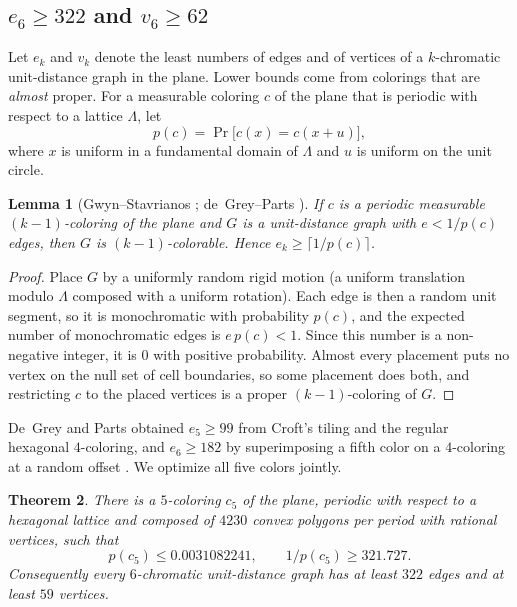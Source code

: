 \documentclass[11pt]{article}
\newtheorem{theorem}{Theorem}[section]
\newtheorem{lemma}[theorem]{Lemma}
\theoremstyle{definition}
\theoremstyle{remark}
\begin{document}
\subsection{$e_6\ge322$ and $v_6\ge62$}\label{sec:e6}

Let $e_k$ and $v_k$ denote the least numbers of edges and of vertices of
a $k$-chromatic unit-distance graph in the plane.  Lower bounds come
from colorings that are \emph{almost} proper.  For a measurable coloring
$c$ of the plane that is periodic with respect to a lattice $\Lambda$,
let
\[
p(c)=\Pr\bigl[c(x)=c(x+u)\bigr],
\]
where $x$ is uniform in a fundamental domain of $\Lambda$ and $u$ is
uniform on the unit circle.

\begin{lemma}[Gwyn--Stavrianos \cite{GwynStavrianos20}; de~Grey--Parts \cite{deGreyParts22}]\label{lem:badness}
If $c$ is a periodic measurable $(k-1)$-coloring of the plane and $G$ is
a unit-distance graph with $e<1/p(c)$ edges, then $G$ is
$(k-1)$-colorable.  Hence $e_k\ge\lceil 1/p(c)\rceil$.
\end{lemma}

\begin{proof}
Place $G$ by a uniformly random rigid motion (a uniform translation
modulo $\Lambda$ composed with a uniform rotation).  Each edge is then a
random unit segment, so it is monochromatic with probability $p(c)$, and
the expected number of monochromatic edges is $e\,p(c)<1$.  Since this
number is a non-negative integer, it is $0$ with positive probability.
Almost every placement puts no vertex on the null set of cell
boundaries, so some placement does both, and restricting $c$ to the
placed vertices is a proper $(k-1)$-coloring of $G$.
\end{proof}

De~Grey and Parts obtained $e_5\ge99$ from Croft's tiling and the
regular hexagonal $4$-coloring, and $e_6\ge182$ by superimposing a fifth
color on a $4$-coloring at a random offset \cite{deGreyParts22}.  We
optimize all five colors jointly.

\begin{theorem}\label{thm:e6}
There is a $5$-coloring $c_5$ of the plane, periodic with respect to a
hexagonal lattice and composed of $4230$ convex polygons per period
with rational vertices, such that
\[
p(c_5)\le 0.0031082241,\qquad 1/p(c_5)\ge 321.727 .
\]
Consequently every $6$-chromatic unit-distance graph has at least $322$
edges and at least $59$ vertices.
\end{theorem}
\end{document}
